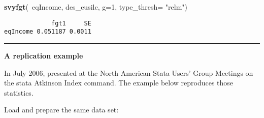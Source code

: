 \documentclass[]{book}
\newenvironment{Shaded}{\begin{snugshade}}{\end{snugshade}}
\newcommand{\KeywordTok}[1]{\textcolor[rgb]{0.13,0.29,0.53}{\textbf{{#1}}}}
\newcommand{\DataTypeTok}[1]{\textcolor[rgb]{0.13,0.29,0.53}{{#1}}}
\newcommand{\DecValTok}[1]{\textcolor[rgb]{0.00,0.00,0.81}{{#1}}}
\newcommand{\StringTok}[1]{\textcolor[rgb]{0.31,0.60,0.02}{{#1}}}
\newcommand{\NormalTok}[1]{{#1}}
\begin{document}
\begin{Shaded}
\begin{Highlighting}[]
\KeywordTok{svyfgt}\NormalTok{(~eqIncome, des_eusilc, }\DataTypeTok{g=}\DecValTok{1}\NormalTok{, }\DataTypeTok{type_thresh=} \StringTok{"relm"}\NormalTok{)}
\end{Highlighting}
\end{Shaded}

\begin{verbatim}
             fgt1     SE
eqIncome 0.051187 0.0011
\end{verbatim}

\begin{center}\rule{0.5\linewidth}{\linethickness}\end{center}

\textbf{A replication example}

In July 2006, \citep{jenkins2006} presented at the North American Stata
Users' Group Meetings on the stata Atkinson Index command. The example
below reproduces those statistics.

Load and prepare the same data set:
\end{document}
